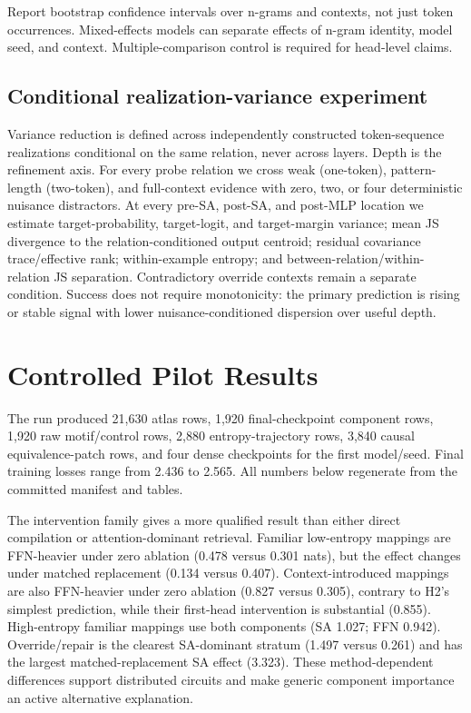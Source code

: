 \documentclass[10pt]{article}
\begin{document}
Report bootstrap confidence intervals over n-grams and contexts, not just token occurrences. Mixed-effects models can separate effects of n-gram identity, model seed, and context. Multiple-comparison control is required for head-level claims.

\subsection{Conditional realization-variance experiment}
Variance reduction is defined across independently constructed token-sequence realizations conditional on the same relation, never across layers. Depth is the refinement axis. For every probe relation we cross weak (one-token), pattern-length (two-token), and full-context evidence with zero, two, or four deterministic nuisance distractors. At every pre-SA, post-SA, and post-MLP location we estimate target-probability, target-logit, and target-margin variance; mean JS divergence to the relation-conditioned output centroid; residual covariance trace/effective rank; within-example entropy; and between-relation/within-relation JS separation. Contradictory override contexts remain a separate condition. Success does not require monotonicity: the primary prediction is rising or stable signal with lower nuisance-conditioned dispersion over useful depth.

\section{Controlled Pilot Results}
The run produced 21,630 atlas rows, 1,920 final-checkpoint component rows, 1,920 raw motif/control rows, 2,880 entropy-trajectory rows, 3,840 causal equivalence-patch rows, and four dense checkpoints for the first model/seed. Final training losses range from 2.436 to 2.565. All numbers below regenerate from the committed manifest and tables.



The intervention family gives a more qualified result than either direct compilation or attention-dominant retrieval. Familiar low-entropy mappings are FFN-heavier under zero ablation (0.478 versus 0.301 nats), but the effect changes under matched replacement (0.134 versus 0.407). Context-introduced mappings are also FFN-heavier under zero ablation (0.827 versus 0.305), contrary to H2's simplest prediction, while their first-head intervention is substantial (0.855). High-entropy familiar mappings use both components (SA 1.027; FFN 0.942). Override/repair is the clearest SA-dominant stratum (1.497 versus 0.261) and has the largest matched-replacement SA effect (3.323). These method-dependent differences support distributed circuits and make generic component importance an active alternative explanation.
\end{document}
